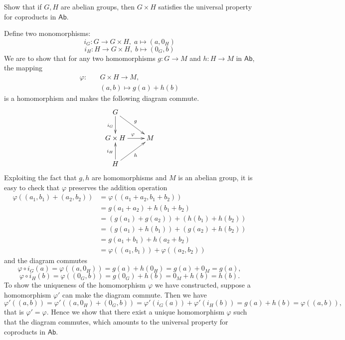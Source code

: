 \documentclass[12pt,letterpaper,boxed]{hmcpset}
\begin{document}
\hypertarget{Exercise 3.3}{}
\begin{problem}[3.3]	
	Show that if $G, H$ are abelian groups, then $G \times H$ satisfies the universal property for coproducts in $\mathsf{Ab}$.
\end{problem}
\begin{solution}
	Define two monomorphisms:
	\[
	i_G:G\longrightarrow G\times H,\;a\longmapsto (a,0_H)
	\]
	\[
	i_H:H\longrightarrow G\times H,\;b\longmapsto (0_G,b)
	\]
	We are to show that for any two homomorphisms $g:G\rightarrow M$ and $h:H\rightarrow M$ in $\mathsf{Ab}$, the mapping
	\[
	\begin{aligned}
	\varphi:\quad & G\times H\longrightarrow M,\\
	         & (a,b)\longmapsto g(a)+h(b)
	\end{aligned}
    \]
    is a homomorphism and makes the following diagram commute. 
	\[\xymatrix{
		G\ar[rd]^{g}\ar[d]_{i_G}  \\
		G \times H\ar[r]^{\varphi} &  M\\
		H\ar[ru]_{h}\ar[u]^{i_H}  
	}\]
	Exploiting the fact that $g,h$ are homomorphisms and $M$ is an abelian group, it is easy to check that $\varphi$ preserves the addition operation
	\[
	\begin{aligned}
	\varphi((a_1,b_1)+(a_2,b_2))&=\varphi((a_1+a_2,b_1+b_2))\\
	&=g(a_1+a_2)+h(b_1+b_2)\\
	&=(g(a_1)+g(a_2))+(h(b_1)+h(b_2))\\
	&=(g(a_1)+h(b_1))+(g(a_2)+h(b_2))\\
	&=g(a_1+b_1)+h(a_2+b_2)\\
	&=\varphi((a_1,b_1))+\varphi((a_2,b_2))
	\end{aligned}
	\]
	and the diagram commutes
	\[
	\varphi\circ i_G(a)=\varphi((a,0_H))=g(a)+h(0_H)=g(a)+0_M=g(a),
	\]
	\[
	\varphi\circ i_H(b)=\varphi((0_G,b))=g(0_G)+h(b)=0_M+h(b)=h(b).
	\]
	To show the uniqueness of the homomorphism $\varphi$ we have constructed, suppose a homomorphism $\varphi'$ can make the diagram commute. Then we have
	\[
	\varphi'((a,b))=\varphi'((a,0_H)+(0_G,b))=\varphi'(i_G(a))+\varphi'(i_H(b))=g(a)+h(b)=\varphi((a,b)),
	\]
	that is $\varphi'=\varphi$. Hence we show that there exist a unique homomorphism $\varphi$ such that the diagram commutes, which amounts to the universal property for coproducts in $\mathsf{Ab}$.
	
\end{solution}
\end{document}
